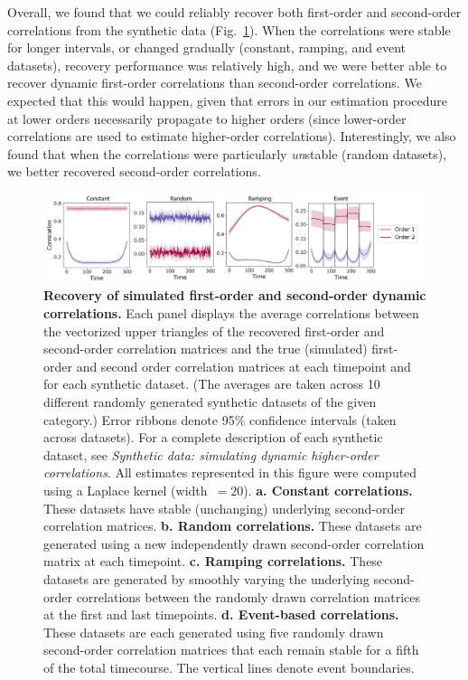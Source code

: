 \documentclass[english]{article}
\begin{document}
Overall, we found that we could reliably recover both first-order and
second-order correlations from the synthetic data
(Fig.~\ref{fig:higher_order_sims}).  When the correlations were stable
for longer intervals, or changed gradually (constant, ramping, and
event datasets), recovery performance was relatively high, and we were
better able to recover dynamic first-order correlations than
second-order correlations.  We expected that this would happen, given
that errors in our estimation procedure at lower orders necessarily
propagate to higher orders (since lower-order correlations are used to
estimate higher-order correlations).  Interestingly, we also found
that when the correlations were particularly \textit{un}stable (random
datasets), we better recovered second-order correlations.

\begin{figure}[tp]
  \centering
  \includegraphics[width=\textwidth]{figs/higher_order_sims}
  \caption{\textbf{Recovery of simulated first-order and second-order dynamic correlations.}  Each panel displays the average correlations
    between the vectorized upper triangles of the recovered
    first-order and second-order correlation matrices and the true
    (simulated) first-order and second order correlation matrices at each
    timepoint and for each synthetic dataset.  (The averages are taken across 10 different
    randomly generated synthetic datasets of the given category.)
    Error ribbons denote 95\% confidence intervals (taken across
    datasets).  For a complete description of each synthetic dataset,
    see \textit{Synthetic data: simulating dynamic higher-order
      correlations}.  All estimates represented in this figure were
    computed using a Laplace kernel
    (width~$=20$).  \textbf{a. Constant correlations.}  These datasets
    have stable (unchanging) underlying second-order correlation
    matrices.  \textbf{b. Random correlations.} These datasets are
    generated using a new independently drawn second-order correlation
    matrix at each timepoint.  \textbf{c. Ramping correlations.}
    These datasets are generated by smoothly varying the underlying
    second-order correlations between the randomly drawn correlation
    matrices at the first and last timepoints.  \textbf{d. Event-based
      correlations.}  These datasets are each generated using five
    randomly drawn second-order correlation matrices that each remain
    stable for a fifth of the total timecourse.  The
    vertical lines denote event boundaries.}
  \label{fig:higher_order_sims}
\end{figure}
\end{document}
